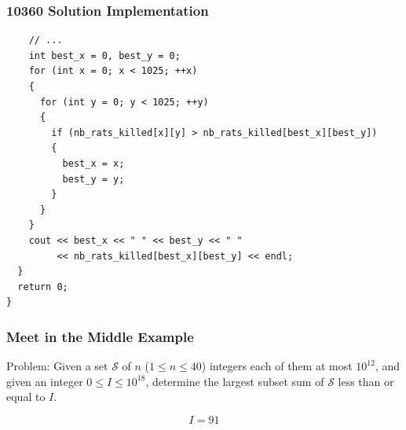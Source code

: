 \documentclass{beamer}
\begin{document}
\begin{frame}[containsverbatim]
\frametitle{10360 Solution Implementation}
\scriptsize

\begin{lstlisting}
    // ...
    int best_x = 0, best_y = 0;
    for (int x = 0; x < 1025; ++x)
    {
      for (int y = 0; y < 1025; ++y)
      {
        if (nb_rats_killed[x][y] > nb_rats_killed[best_x][best_y])
        {
          best_x = x;
          best_y = y;
        }
      }
    }
    cout << best_x << " " << best_y << " "
         << nb_rats_killed[best_x][best_y] << endl;
  }
  return 0;
}
\end{lstlisting}

\end{frame}

\fi

\begin{frame}%
\frametitle{Meet in the Middle Example}


\begin{mdframed}[style=exampledefault]
Problem: Given a set $\mathcal{S}$ of $n$ ($1 \le n \le 40$) integers each of them at most $10^{12}$, and given an integer $0 \le I \le 10^{18}$, determine
the largest subset sum of $\mathcal{S}$ less than or equal to $I$.
\end{mdframed}

\begin{overlayarea}{1\textwidth}{0.6\textheight}
\huge
$$
I = 91
$$
\Large
{}
\end{overlayarea}

\end{frame}
\end{document}
